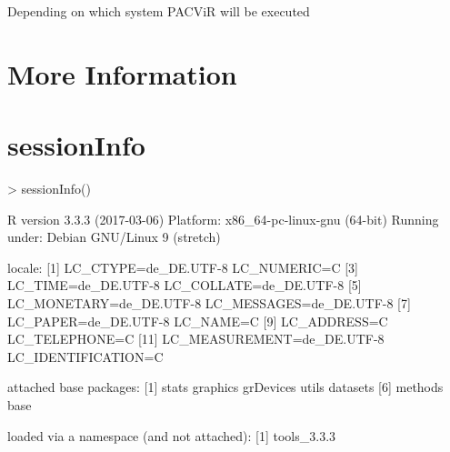 \documentclass[letterpaper]{article}
\begin{document}
  Depending on which system PACViR will be executed

\section{More Information}

\section{sessionInfo}

\begin{Schunk}
\begin{Sinput}
> sessionInfo()
\end{Sinput}
\begin{Soutput}
R version 3.3.3 (2017-03-06)
Platform: x86_64-pc-linux-gnu (64-bit)
Running under: Debian GNU/Linux 9 (stretch)

locale:
 [1] LC_CTYPE=de_DE.UTF-8       LC_NUMERIC=C              
 [3] LC_TIME=de_DE.UTF-8        LC_COLLATE=de_DE.UTF-8    
 [5] LC_MONETARY=de_DE.UTF-8    LC_MESSAGES=de_DE.UTF-8   
 [7] LC_PAPER=de_DE.UTF-8       LC_NAME=C                 
 [9] LC_ADDRESS=C               LC_TELEPHONE=C            
[11] LC_MEASUREMENT=de_DE.UTF-8 LC_IDENTIFICATION=C       

attached base packages:
[1] stats     graphics  grDevices utils     datasets 
[6] methods   base     

loaded via a namespace (and not attached):
[1] tools_3.3.3
\end{Soutput}
\end{Schunk}
\end{document}
